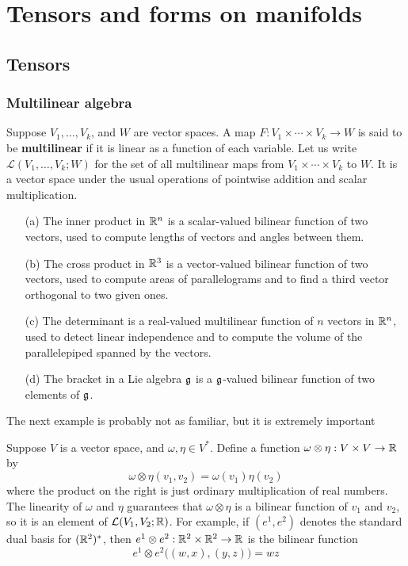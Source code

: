 \chapter{Tensors and forms on manifolds}
\section{Tensors}
\subsection{Multilinear algebra}
Suppose $V_1,\dots,V_k$, and $W$ are vector spaces. A map $F:V_1\times\cdots\times V_k\to W$ is said to be \textbf{multilinear} if it is linear as a function of each variable. Let us write $\mathcal{L}(V_1,\dots,V_k;W)$ for the set of all multilinear maps from $V_1\times\cdots\times V_k$ to $W$. It is a vector space under the usual operations of pointwise addition and scalar multiplication.
\begin{example}
\mbox{}
\begin{itemize}
\item[(a)] The inner product in $\mathbb{R}^n$ is a scalar-valued bilinear function of two vectors, used to compute lengths of vectors and angles between them.
\item[(b)] The cross product in $\mathbb{R}^3$ is a vector-valued bilinear function of two vectors, used to compute areas of parallelograms and to find a third vector orthogonal to two given ones.
\item[(c)] The determinant is a real-valued multilinear function of $n$ vectors in $\mathbb{R}^n$, used to detect linear independence and to compute the volume of the parallelepiped spanned by the vectors.
\item[(d)] The bracket in a Lie algebra $\mathfrak{g}$ is a $\mathfrak{g}$-valued bilinear function of two elements of $\mathfrak{g}$.
\end{itemize}
\end{example}
The next example is probably not as familiar, but it is extremely important
\begin{example}
Suppose $V$ is a vector space, and $\omega,\eta\in V^*$. Define a function $\omega\otimes\eta:V\times V\to\mathbb{R}$ by
\[\omega\otimes\eta(v_1,v_2)=\omega(v_1)\eta(v_2)\]
where the product on the right is just ordinary multiplication of real numbers. The linearity of $\omega$ and $\eta$ guarantees that $\omega\otimes\eta$ is a bilinear function of $v_1$ and $v_2$, so it is an element of $\mathcal{L}(V_1,V_2;\mathbb{R})$. For example, if $(e^1,e^2)$ denotes the standard dual basis for $(\mathbb{R}^2)^*$, then $e^1\otimes e^2:\mathbb{R}^2\times\mathbb{R}^2\to\mathbb{R}$ is the bilinear function
\[e^1\otimes e^2\big((w,x),(y,z)\big)=wz\]
\end{example}

